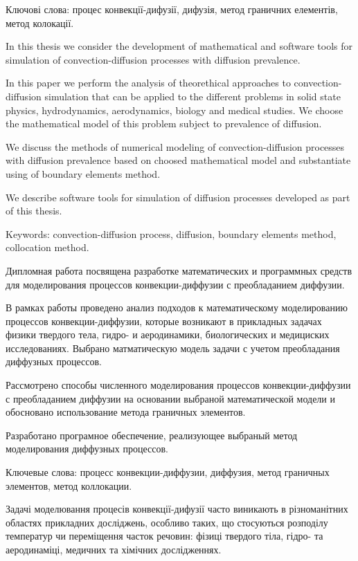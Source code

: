 \documentclass{diploma}
\begin{document}
Ключові слова: процес конвекції-дифузії, дифузія, метод граничних елементів, метод колокації.

In this thesis we consider the development of mathematical and software tools for simulation of convection-diffusion processes with diffusion prevalence.

In this paper we perform the analysis of theorethical approaches to convection-diffusion simulation that can be applied to the different problems in solid state physics, hydrodynamics, aerodynamics, biology and medical studies. We choose the mathematical model of this problem subject to prevalence of diffusion.

We discuss the methods of numerical modeling of convection-diffusion processes with diffusion prevalence based on choosed mathematical model and substantiate using of boundary elements method.

We describe software tools for simulation of diffusion processes developed as part of this thesis.

Keywords: convection-diffusion process, diffusion, boundary elements method, collocation method.

Дипломная работа посвящена разработке математических и программных средств для моделирования процессов конвекции-диффузии с преобладанием диффузии.

В рамках работы проведено анализ подходов к математическому моделированию процессов конвекции-диффузии, которые возникают в прикладных задачах физики твердого тела, гидро- и аеродинамики, биологических и медициских исследованиях. Выбрано матматическую модель задачи с учетом преобладания диффузных процессов.

Рассмотрено способы численного моделирования процессов конвекции-диффузии с преобладанием диффузии на основании выбраной математической модели и обосновано использование метода граничных элементов.

Разработано програмное обеспечение, реализующее выбраный метод моделирования диффузных процессов.

Ключевые слова: процесс конвекции-диффузии, диффузия, метод граничных элементов, метод коллокации.

\tableofcontents

\intro
Задачі моделювання процесів конвекції-дифузії часто виникають в різноманітних областях прикладних досліджень, особливо таких, що стосуються розподілу температур чи переміщення часток речовин: фізиці твердого тіла, гідро- та аеродинаміці, медичних та хімічних дослідженнях.
\end{document}
